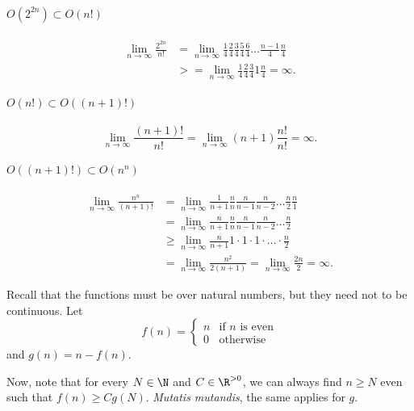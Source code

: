 \paragraph{$O(2^{2n}) \subset O(n!)$}
\begin{align*}
    \lim_{n \to \infty} \frac{2^{2n}}{n!} &= \lim_{n \to \infty} \frac{1}{4}\frac{2}{4}\frac{3}{4}\frac{5}{4}\frac{6}{4}\ldots \frac{n-1}{4} \frac{n}{4} \\
    &>= \lim_{n \to \infty} \frac{1}{4}\frac{2}{4}\frac{3}{4} 1 \frac{n}{4} = \infty
.\end{align*}

\paragraph{$O(n!) \subset O((n+1)!)$}
\[
    \lim_{n \to \infty} \frac{(n+1)!}{n!} = \lim_{n \to \infty} (n+1)\frac{n!}{n!} = \infty
.\] 

\paragraph{$O((n+1)!) \subset O(n^{n})$}
\begin{align*}
    \lim_{n \to \infty} \frac{n^{n}}{(n+1)!} &= \lim_{n \to \infty} \frac{1}{n+1} \frac{n}{n} \frac{n}{n-1} \frac{n}{n-2} \ldots \frac{n}{2}\frac{n}{1} \\
    &= \lim_{n \to \infty} \frac{n}{n+1}\frac{n}{n} \frac{n}{n-1} \frac{n}{n-2} \ldots \frac{n}{2} \\
    &\ge \lim_{n \to \infty} \frac{n}{n+1} 1 \cdot 1\cdot 1\cdot \ldots\cdot \frac{n}{2}  \\
    &= \lim_{n \to \infty} \frac{n^2}{2(n+1)} = \lim_{n \to \infty} \frac{2n}{2} = \infty
.\end{align*}


Recall that the functions must be over natural numbers, but they need not to be continuous.
Let \[
f(n) = \begin{cases}
    n & \text{if }n\text{ is even} \\
    0 & \text{otherwise}
\end{cases}
\] and $g(n) = n - f(n)$.

Now, note that for every $N\in \N$ and $C \in \R^{>0}$, we can always find $n \ge N$ even such that $f(n) \ge Cg(N)$.
\emph{Mutatis mutandis}, the same applies for $g$.





